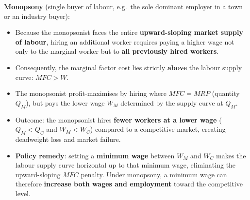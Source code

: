 \textbf{Monopsony} (single buyer of labour, e.g.\ the sole dominant employer in a town or an industry buyer):
\begin{itemize}
  \item Because the monopsonist faces the entire \textbf{upward-sloping market supply of labour}, hiring an additional worker requires paying a higher wage not only to the marginal worker but to \textbf{all previously hired workers}.
  \item Consequently, the marginal factor cost lies strictly \textbf{above} the labour supply curve: $MFC > W$.
  \item The monopsonist profit-maximises by hiring where $MFC = MRP$ (quantity $Q_M$), but pays the lower wage $W_M$ determined by the supply curve at $Q_M$.
  \item Outcome: the monopsonist hires \textbf{fewer workers at a lower wage} ($Q_M < Q_C$ and $W_M < W_C$) compared to a competitive market, creating deadweight loss and market failure.
  \item \textbf{Policy remedy}: setting a \textbf{minimum wage} between $W_M$ and $W_C$ makes the labour supply curve horizontal up to that minimum wage, eliminating the upward-sloping $MFC$ penalty. Under monopsony, a minimum wage can therefore \textbf{increase both wages and employment} toward the competitive level.
\end{itemize}
\begin{center}
\end{center}
\newpage

